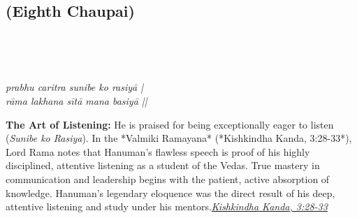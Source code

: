 
\newpage

\subsection*{ (Eighth Chaupai)}

\begin{minipage}[t]{0.55\textwidth}
\vspace{0pt}

{\large \linespread{1.5}\selectfont
{}\\
\par}

\vspace{0.5em}

{\large \linespread{1.5}\selectfont
{}\\
\par}

\vspace{0.5em}

{\large \linespread{1.3}\selectfont
\textit{prabhu caritra sunibe ko rasiyā |}\\
\textit{rāma lakhana sītā mana basiyā ||}
\par}
\end{minipage}%
\hfill
\begin{minipage}[t]{0.42\textwidth}
\vspace{0pt}
\begin{tcolorbox}[anchorbox]
\textbf{The Art of Listening:} He is praised for being exceptionally eager to listen (\textit{Sunibe ko Rasiya}). In the *Valmiki Ramayana* (*Kishkindha Kanda, 3:28-33*), Lord Rama notes that Hanuman's flawless speech is proof of his highly disciplined, attentive listening as a student of the Vedas. True mastery in communication and leadership begins with the patient, active absorption of knowledge.
\vspace{0.5em}\newline Hanuman's legendary eloquence was the direct result of his deep, attentive listening and study under his mentors.\newline\null\hfill\href{https://www.valmiki.iitk.ac.in/sloka?field_kanda_tid=4&language=dv&field_sarga_value=3}{\textit{Kishkindha Kanda, 3:28-33}}
\end{tcolorbox}
\end{minipage}

